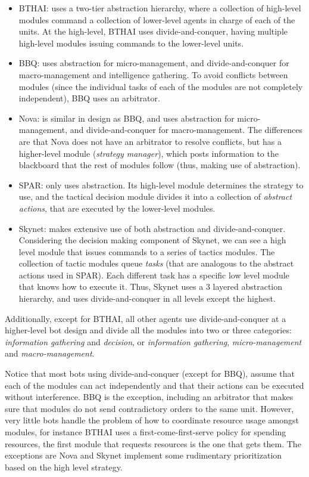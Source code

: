 \documentclass[journal]{IEEEtran}
\begin{document}
\begin{itemize}
\item BTHAI: uses a two-tier abstraction hierarchy, where a collection of high-level modules command a collection of lower-level agents in charge of each of the units. At the high-level, BTHAI uses divide-and-conquer, having multiple high-level modules issuing commands to the lower-level units.
\item BBQ: uses abstraction for micro-management, and divide-and-conquer for macro-management and intelligence gathering. To avoid conflicts between modules (since the individual tasks of each of the modules are not completely independent), BBQ uses an arbitrator.
\item Nova: is similar in design as BBQ, and uses abstraction for micro-management, and divide-and-conquer for macro-management. The differences are that Nova does not have an arbitrator to resolve conflicts, but has a higher-level module ({\em strategy manager}), which posts information to the blackboard that the rest of modules follow (thus, making use of abstraction).
\item SPAR: only uses abstraction. Its high-level module determines the strategy to use, and the tactical decision module divides it into a collection of {\em abstract actions}, that are executed by the lower-level modules.
\item Skynet: makes extensive use of both abstraction and divide-and-conquer. Considering the decision making component of Skynet, we can see a high level module that issues commands to a series of tactics modules. The collection of tactic modules queue {\em tasks} (that are analogous to the abstract actions used in SPAR). Each different task has a specific low level module that knows how to execute it. Thus, Skynet uses a 3 layered abstraction hierarchy, and uses divide-and-conquer in all levels except the highest.
\end{itemize}

Additionally, except for BTHAI, all other agents use divide-and-conquer at a higher-level bot design and divide all the modules into two or three categories: {\em information gathering} and {\em decision}, or {\em information gathering}, {\em micro-management} and {\em macro-management}.

Notice that most bots using divide-and-conquer (except for BBQ), assume that each of the modules can act independently and that their actions can be executed without interference. BBQ is the exception, including an arbitrator that makes sure that modules do not send contradictory orders to the same unit. However, very little bots handle the problem of how to coordinate resource usage amongst modules, for instance BTHAI uses a first-come-first-serve policy for spending resources, the first module that requests resources is the one that gets them. The exceptions are Nova and Skynet implement some rudimentary prioritization based on the high level strategy.
\end{document}
